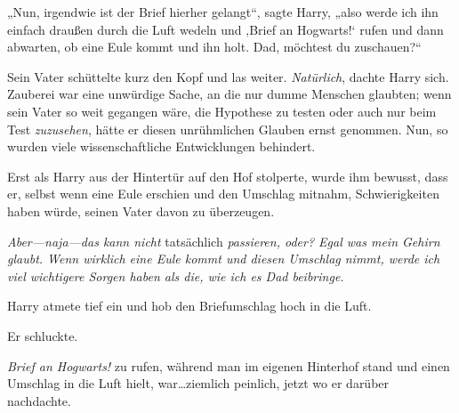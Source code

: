 „Nun, irgendwie ist der Brief hierher gelangt“, sagte Harry, „also werde ich ihn einfach draußen durch die Luft wedeln und ‚Brief an Hogwarts!‘ rufen und dann abwarten, ob eine Eule kommt und ihn holt. Dad, möchtest du zuschauen?“

Sein Vater schüttelte kurz den Kopf und las weiter. \emph{Natürlich}, dachte Harry sich. Zauberei war eine unwürdige Sache, an die nur dumme Menschen glaubten; wenn sein Vater so weit gegangen wäre, die Hypothese zu testen oder auch nur beim Test \emph{zuzusehen}, hätte er diesen unrühmlichen Glauben ernst genommen. Nun, so wurden viele wissenschaftliche Entwicklungen behindert.

Erst als Harry aus der Hintertür auf den Hof stolperte, wurde ihm bewusst, dass er, selbst wenn eine Eule erschien und den Umschlag mitnahm, Schwierigkeiten haben würde, seinen Vater davon zu überzeugen.

\emph{Aber—naja—das kann nicht} tatsächlich \emph{passieren, oder? Egal was mein Gehirn glaubt. Wenn wirklich eine Eule kommt und diesen Umschlag nimmt, werde ich viel wichtigere Sorgen haben als die, wie ich es Dad beibringe.}

Harry atmete tief ein und hob den Briefumschlag hoch in die Luft.

Er schluckte.

\emph{Brief an Hogwarts!} zu rufen, während man im eigenen Hinterhof stand und einen Umschlag in die Luft hielt, war…ziemlich peinlich, jetzt wo er darüber nachdachte.

